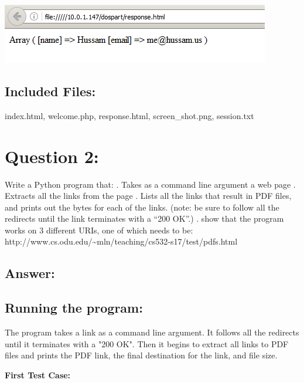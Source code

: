 \documentclass[a4paper, 11pt]{article}
\begin{document}
\begin{center}
\includegraphics{screen_shot.png}
\end{center}
\subsection*{Included Files:}
index.html, welcome.php, response.html, screen\_shot.png, session.txt

\section*{Question 2:}
Write a Python program that:
\newline
{}. Takes as a command line argument a web page
\newline
{}. Extracts all the links from the page
\newline
{}. Lists all the links that result in PDF files, and prints out the bytes for each of the links. 
\newline
\indent
(note: be sure to follow all the redirects until the link terminates with a ``200 OK''.)
\newline
{}. show that the program works on 3 different URIs, one of which needs to be:
\newline
\indent
http://www.cs.odu.edu/\textasciitilde mln/teaching/cs532-s17/test/pdfs.html
     
\subsection*{Answer:} 


\subsection*{Running the program:}
The program takes a link as a command line argument. It follows all the redirects until it terminates with a "200 OK". Then it begins to extract all links to PDF files and prints the PDF link, the final destination for the link, and file size. 

\noindent
\textbf{First Test Case:}
\end{document}
